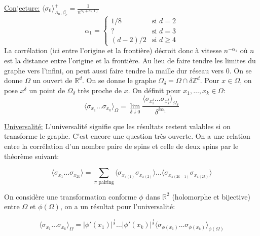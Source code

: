 \documentclass[a4paper,12pt]{report}
\begin{document}
\underline{Conjecture:} $\langle \sigma_0 \rangle^+_{\Lambda_n, \beta_c} = \frac{1}{n^{\alpha_1 + o(1)}}$
\newline
\begin{equation*}
\alpha_1 =
\begin{cases}
1/8 & \text{si } d=2 \\
? & \text{si } d=3 \\
(d-2)/2 & \text{si } d \geq 4
\end{cases}
\end{equation*}
\newline
La corrélation (ici entre l'origine et la frontière) décroit donc à vitesse $n^{-\alpha_1}$ où $n$ est la distance entre l'origine et la frontière.
\newline
\newline
Au lieu de faire tendre les limites du graphe vers l'infini, on peut aussi faire tendre la maille dur réseau vers 0. On se donne $\Omega$ un ouvert de $\mathbb{R}^d$. On se donne le graphe $\Omega_{\delta} = \Omega \cap \delta \mathbb{Z}^d$. Pour $x \in \Omega$, on pose $x^{\delta}$ un point de $\Omega_{\delta}$ très proche de $x$. On définit pour $x_1, \dots, x_k \in \Omega$:
$$
\langle \sigma_{x_1} \dots \sigma_{x_k} \rangle_{\Omega} = \lim_{\delta \downarrow 0} \frac{\langle \sigma_{x_1^{\delta}} \dots \sigma_{x_k^{\delta}} \rangle_{\Omega_{\delta}}}{\delta^{k\alpha_1}}
$$
\newline

\underline{Universalité:}
L'universalité signifie que les résultats restent valables si on transforme le graphe. C'est encore une question très ouverte.
On a une relation entre la corrélation d'un nombre paire de spins et celle de deux spins par le théorème suivant:

\begin{thm}[Aizenman]
$$\langle \sigma_{x_1} \dots \sigma_{x_{2k}} \rangle = \sum_{\pi \text{ pairing}} \langle \sigma_{x_{\pi(1)}} \sigma_{x_{\pi(2)}} \rangle \dots \langle \sigma_{x_{\pi(2k-1)}}\sigma_{x_{\pi(2k)}} \rangle$$
\end{thm}

On considère une transformation conforme $\phi$ dans $\mathbb{R}^2$ (holomorphe et bijective) entre $\Omega$ et $\phi(\Omega)$, on a un résultat pour l'universalité:

\begin{thm}
$$\langle \sigma_{x_1} \dots \sigma_{x_k} \rangle_{\Omega} = |\phi'(x_1)|^{\frac{1}{8}}\dots |\phi'(x_k)|^{\frac{1}{8}} \langle \sigma_{\phi(x_1)} \dots \sigma_{\phi(x_k)} \rangle_{\phi(\Omega)}$$
\end{thm}
\end{document}
